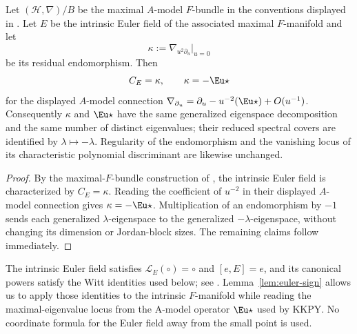 \begin{lemma}\label{lem:euler-sign}
%
%
%
Let $(\mathcal H,\nabla)/B$ be the maximal $A$-model $F$-bundle in the
conventions displayed in \cite{KKPYY}.  Let $E$ be the intrinsic Euler field
of the associated maximal $F$-manifold and let
\[
  \kappa:=\nabla_{u^2\partial_u}|_{u=0}
\]
be its residual endomorphism.  Then
\[
  C_E=\kappa,
  \qquad
  \kappa=-\Eu\star
\]
for the displayed $A$-model connection
$\nabla_{\partial_u}=\partial_u-u^{-2}(\Eu\star)+O(u^{-1})$.
Consequently $\kappa$ and $\Eu\star$ have the same generalized
eigenspace decomposition and the same number of distinct eigenvalues; their
reduced spectral covers are identified by $\lambda\mapsto-\lambda$.
Regularity of the endomorphism and the vanishing locus of its characteristic
polynomial discriminant are likewise unchanged.
\end{lemma}

\begin{proof}
By the maximal-$F$-bundle construction of \cite{KKPYY}, the intrinsic Euler
field is characterized by $C_E=\kappa$.  Reading the coefficient of
$u^{-2}$ in their displayed $A$-model connection gives
$\kappa=-\Eu\star$.  Multiplication of an endomorphism by $-1$ sends each
generalized $\lambda$-eigenspace to the generalized $-\lambda$-eigenspace,
without changing its dimension or Jordan-block sizes.  The remaining claims
follow immediately.
\end{proof}

The intrinsic Euler field satisfies
$\mathcal L_E(\circ)=\circ$ and $[e,E]=e$, and its canonical powers satisfy
the Witt identities used below; see \cite{DavidHertling}.  Lemma~\ref{lem:euler-sign}
allows us to apply those identities to the intrinsic $F$-manifold while
reading the maximal-eigenvalue locus from the A-model operator
$\Eu\star$ used by KKPY.  No coordinate formula for the Euler field away
from the small point is used.

